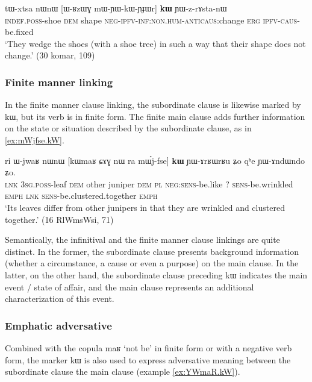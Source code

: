 \documentclass[oldfontcommands,oneside,a4paper,11pt]{article}
\newcommand{\ipa}[1]{{\phon #1}} %
\begin{document}
\begin{exe}
\ex \label{ex:mWYWkWYJWr}
\gll
\ipa{tɯ-xtsa}   	\ipa{nɯnɯ}   	[\ipa{ɯ-ʁzɯɣ}   	\ipa{mɯ-ɲɯ-kɯ-ɲɟɯr}]   	\ipa{\textbf{kɯ}}   	\ipa{ɲɯ-z-rɤsta-nɯ}   \\
\textsc{indef.poss}-shoe \textsc{dem} shape \textsc{neg-ipfv-inf:non.hum-anticaus}:change \textsc{erg} \textsc{ipfv-caus}-be.fixed \\
\glt `They wedge the shoes (with a shoe tree)  in such a way that their shape does not change.' (30 komar, 109)
\end{exe}

\subsubsection{Finite manner linking}
In the finite manner clause linking, the subordinate clause is likewise marked by \ipa{kɯ}, but its verb is in finite form. The  finite  main clause adds further information on the state or situation described by the subordinate clause, as in \ref{ex:mWjfse.kW}. 
 

 \begin{exe}
\ex \label{ex:mWjfse.kW}
\gll
\ipa{ri} 	\ipa{ɯ-jwaʁ} 	\ipa{nɯnɯ} 	[\ipa{kɯmaʁ} 	\ipa{ɕɤɣ} 	\ipa{nɯ} \ipa{ra} 	\ipa{mɯ́j-fse}] 	\ipa{\textbf{kɯ}} 	\ipa{ɲɯ-ɤrʁɯrʁu} 	\ipa{ʑo} 	\ipa{qʰe} 	\ipa{ɲɯ-ɤndɯndo} 	\ipa{ʑo.} \\
\textsc{lnk} \textsc{3sg.poss}-leaf \textsc{dem} other juniper \textsc{dem} \textsc{pl} \textsc{neg:sens}-be.like ?{ } \textsc{sens}-be.wrinkled \textsc{emph} \textsc{lnk}  \textsc{sens}-be.clustered.together \textsc{emph} \\
\glt `Its leaves differ from other junipers in that they are wrinkled and clustered together.' (16 RlWmsWsi, 71)
 \end{exe}
 
Semantically,  the infinitival and the finite manner clause linkings are quite distinct. In the former, the subordinate clause presents background information (whether a circumstance, a cause or even a purpose) on the main clause. In the latter, on the other hand, the subordinate clause preceding \ipa{kɯ} indicates the main event / state of affair, and the main clause represents an additional characterization of this event.

 

 \subsubsection{Emphatic adversative} \label{sec:advers}
Combined with the copula \ipa{maʁ} `not be' in finite form or with a negative verb form, the marker \ipa{kɯ} is also used to express adversative meaning between the subordinate clause the main clause (example \ref{ex:YWmaR.kW}).
 
\end{document}
